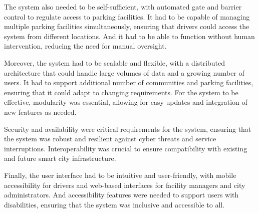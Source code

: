 The system also needed to be self-sufficient, with automated gate and barrier control to regulate access to parking facilities.
It had to be capable of managing multiple parking facilities simultaneously, ensuring that drivers could access the system from different locations.
And it had to be able to function without human intervention, reducing the need for manual oversight.

Moreover, the system had to be scalable and flexible, with a distributed architecture that could handle large volumes of data and a growing number of users.
It had to support additional number of communities and parking facilities, ensuring that it could adapt to changing requirements.
For the system to be effective, modularity was essential, allowing for easy updates and integration of new features as needed.

Security and availability were critical requirements for the system, ensuring that the system was robust and resilient against cyber threats and service interruptions.
Interoperability was crucial to ensure compatibility with existing and future smart city infrastructure.

Finally, the user interface had to be intuitive and user-friendly, with mobile accessibility for drivers and web-based interfaces for facility managers and city administrators.
And accessibility features were needed to support users with disabilities, ensuring that the system was inclusive and accessible to all.
